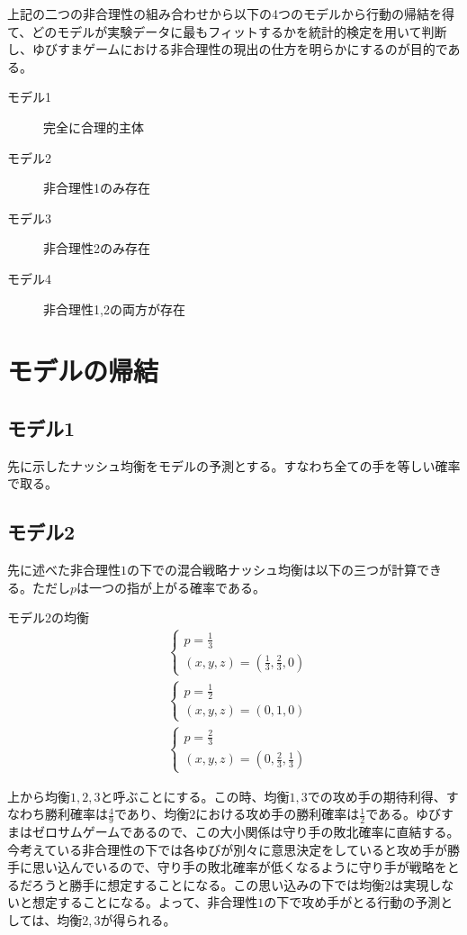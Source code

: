 \documentclass{jsarticle}
\begin{document}
上記の二つの非合理性の組み合わせから以下の4つのモデルから行動の帰結を得て、どのモデルが実験データに最もフィットするかを統計的検定を用いて判断し、ゆびすまゲームにおける非合理性の現出の仕方を明らかにするのが目的である。

\begin{description}
	\item[モデル1] 完全に合理的主体
	\item[モデル2] 非合理性1のみ存在
	\item[モデル3] 非合理性2のみ存在
	\item[モデル4] 非合理性1,2の両方が存在
\end{description}

\section{モデルの帰結}
\subsection{モデル1}
先に示したナッシュ均衡をモデルの予測とする。すなわち全ての手を等しい確率で取る。

\subsection{モデル2}
先に述べた非合理性$1$の下での混合戦略ナッシュ均衡は以下の三つが計算できる。ただし$p$は一つの指が上がる確率である。
\begin{itembox}[l]{モデル2の均衡}
\begin{align}
    	&\begin{cases}
		p = \frac{1}{3}\\
		(x, y, z) = (\frac{1}{3}, \frac{2}{3}, 0)
	\end{cases}\\[10pt]
	&\begin{cases}
		p = \frac{1}{2}\\
		(x, y, z) = (0, 1, 0)
	\end{cases}\\[10pt]
	&\begin{cases}
		p = \frac{2}{3}\\
		(x, y, z) = (0, \frac{2}{3}, \frac{1}{3})
	\end{cases}
\end{align}
\end{itembox}
上から均衡$1,2,3$と呼ぶことにする。この時、均衡$1,3$での攻め手の期待利得、すなわち勝利確率は$\frac{4}{9}$であり、均衡$2$における攻め手の勝利確率は$\frac{1}{2}$である。ゆびすまはゼロサムゲームであるので、この大小関係は守り手の敗北確率に直結する。今考えている非合理性の下では各ゆびが別々に意思決定をしていると攻め手が勝手に思い込んでいるので、守り手の敗北確率が低くなるように守り手が戦略をとるだろうと勝手に想定することになる。この思い込みの下では均衡$2$は実現しないと想定することになる。よって、非合理性$1$の下で攻め手がとる行動の予測としては、均衡$2,3$が得られる。
\end{document}
